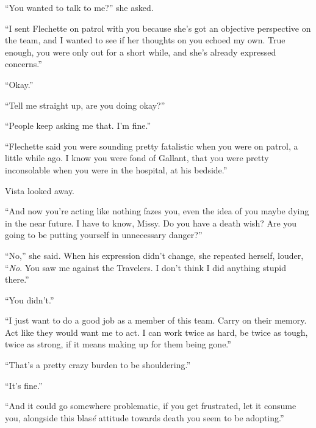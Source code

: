 ``You wanted to talk to me?'' she asked.



``I sent Flechette on patrol with you because she's got an objective perspective on the team, and I wanted to see if her thoughts on you echoed my own.  True enough, you were only out for a short while, and she's already expressed concerns.''



``Okay.''



``Tell me straight up, are you doing okay?''



``People keep asking me that.  I'm fine.''



``Flechette said you were sounding pretty fatalistic when you were on patrol, a little while ago.  I know you were fond of Gallant, that you were pretty inconsolable when you were in the hospital, at his bedside.''



Vista looked away.



``And now you're acting like nothing fazes you, even the idea of you maybe dying in the near future.  I have to know, Missy.  Do you have a death wish?  Are you going to be putting yourself in unnecessary danger?''



``No,'' she said.  When his expression didn't change, she repeated herself, louder, ``\emph{No}.  You saw me against the Travelers.  I don't think I did anything stupid there.''



``You didn't.''



``I just want to do a good job as a member of this team.  Carry on their memory.  Act like they would want me to act.  I can work twice as hard, be twice as tough, twice as strong, if it means making up for them being gone.''



``That's a pretty crazy burden to be shouldering.''



``It's fine.''



``And it could go somewhere problematic, if you get frustrated, let it consume you, alongside this blas\emph{\'{e}} attitude towards death you seem to be adopting.''



